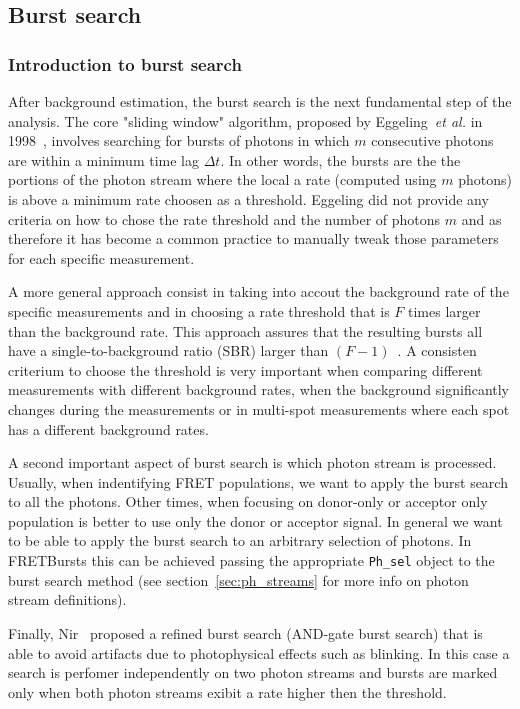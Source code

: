 \subsection{Burst search}
\label{sec:burstsearch}

\subsubsection{Introduction to burst search}
After background estimation, the burst search is the next fundamental step of the analysis. The core "sliding window" algorithm, proposed by Eggeling~\textit{et al.} in 1998~\cite{Eggeling_1998}, involves searching for bursts of photons
in which $m$ consecutive photons are within a minimum time lag $\Delta t$. In other words, the bursts are the the portions of the photon stream where the local a rate (computed using $m$ photons) is above a minimum rate choosen as a threshold. Eggeling did not provide any criteria on how to chose the rate threshold and the number of photons $m$ and as therefore it has become a common practice to manually tweak those parameters for each specific measurement. 

A more general approach consist in taking into accout the background rate of the specific measurements and in choosing a rate threshold that is $F$ times larger than the background rate. This approach assures that the resulting bursts all have a single-to-background ratio (SBR) larger than $(F-1)$~\cite{Michalet_2012}. A consisten criterium to choose the threshold is very important when comparing different measurements with different background rates, when the background significantly changes during the measurements or in multi-spot measurements where each spot has a different background rates.

A second important aspect of burst search is which photon stream is processed. Usually, when indentifying FRET populations, we want to apply the burst search to all the photons. Other times, when focusing on donor-only or acceptor only population is better to use only the donor or acceptor signal. In general we want to be able to apply the burst search to an arbitrary selection of photons. In FRETBursts this can be achieved passing the appropriate \verb|Ph_sel| object to the burst search method (see section~\ref{sec:ph_streams} for more info on photon stream definitions).

Finally, Nir~ proposed a refined burst search (AND-gate burst search) that is able to avoid artifacts due to photophysical effects such as blinking. In this case a search is perfomer independently on two photon streams and bursts are marked only when both photon streams exibit a rate higher then the threshold.

